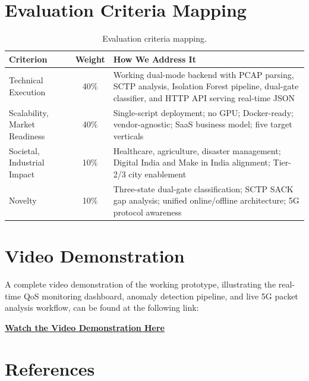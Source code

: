\documentclass[11pt, a4paper]{article}
\begin{document}
\section{Evaluation Criteria Mapping}

\begin{table}[H]
\centering
\begin{tabular}{l c p{8cm}}
\toprule
\textbf{Criterion} & \textbf{Weight} & \textbf{How We Address It} \\
\midrule
Technical Execution & 40\% & Working dual-mode backend with PCAP parsing, SCTP analysis, Isolation Forest pipeline, dual-gate classifier, and HTTP API serving real-time JSON \\
Scalability, Market Readiness & 40\% & Single-script deployment; no GPU; Docker-ready; vendor-agnostic; SaaS business model; five target verticals \\
Societal, Industrial Impact & 10\% & Healthcare, agriculture, disaster management; Digital India and Make in India alignment; Tier-2/3 city enablement \\
Novelty & 10\% & Three-state dual-gate classification; SCTP SACK gap analysis; unified online/offline architecture; 5G protocol awareness \\
\bottomrule
\end{tabular}
\caption{Evaluation criteria mapping.}
\label{tab:criteria}
\end{table}

\section{Video Demonstration}

A complete video demonstration of the working prototype, illustrating the real-time QoS monitoring dashboard, anomaly detection pipeline, and live 5G packet analysis workflow, can be found at the following link:

\begin{center}
\large
\href{https://drive.google.com/file/d/1o2JeBPJFspz6Ibny3hdDM3Wm70WVnwAe/view?usp=sharing}{\textbf{Watch the Video Demonstration Here}}
\end{center}

\section{References}
\end{document}
